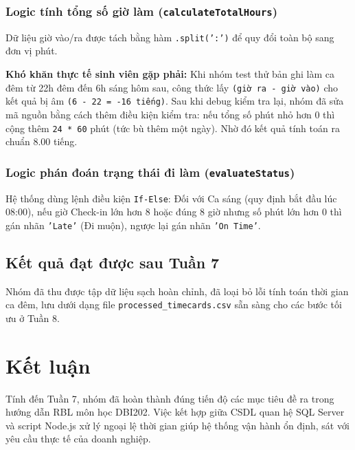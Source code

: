 \documentclass[12pt,a4paper]{article}
\begin{document}
\subsubsection{Logic tính tổng số giờ làm (\texttt{calculateTotalHours})}
Dữ liệu giờ vào/ra được tách bằng hàm \texttt{.split(':')} để quy đổi toàn bộ sang đơn vị phút. 

\noindent \textbf{Khó khăn thực tế sinh viên gặp phải:} Khi nhóm test thử bản ghi làm ca đêm từ 22h đêm đến 6h sáng hôm sau, công thức lấy \texttt{(giờ ra - giờ vào)} cho kết quả bị âm \texttt{(6 - 22 = -16 tiếng)}. Sau khi debug kiểm tra lại, nhóm đã sửa mã nguồn bằng cách thêm điều kiện kiểm tra: nếu tổng số phút nhỏ hơn 0 thì cộng thêm \texttt{24 * 60} phút (tức bù thêm một ngày). Nhờ đó kết quả tính toán ra chuẩn 8.00 tiếng.

\subsubsection{Logic phán đoán trạng thái đi làm (\texttt{evaluateStatus})}
Hệ thống dùng lệnh điều kiện \texttt{If-Else}: Đối với Ca sáng (quy định bắt đầu lúc 08:00), nếu giờ Check-in lớn hơn 8 hoặc đúng 8 giờ nhưng số phút lớn hơn 0 thì gán nhãn \texttt{'Late'} (Đi muộn), ngược lại gán nhãn \texttt{'On Time'}.

\subsection{Kết quả đạt được sau Tuần 7}
Nhóm đã thu được tập dữ liệu sạch hoàn chỉnh, đã loại bỏ lỗi tính toán thời gian ca đêm, lưu dưới dạng file \texttt{processed\_timecards.csv} sẵn sàng cho các bước tối ưu ở Tuần 8.

\section{Kết luận}
Tính đến Tuần 7, nhóm đã hoàn thành đúng tiến độ các mục tiêu đề ra trong hướng dẫn RBL môn học DBI202. Việc kết hợp giữa CSDL quan hệ SQL Server và script Node.js xử lý ngoại lệ thời gian giúp hệ thống vận hành ổn định, sát với yêu cầu thực tế của doanh nghiệp.
\end{document}
